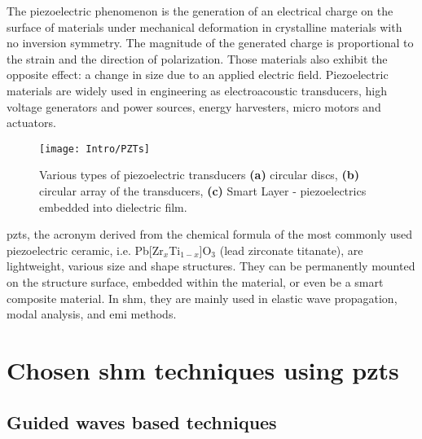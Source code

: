 \documentclass[11pt,a4paper,final]{report}
\begin{document}
The piezoelectric phenomenon is the generation of an electrical charge on the surface of materials under mechanical deformation in crystalline materials with no inversion symmetry.
The magnitude of the generated charge is proportional to the strain and the direction of polarization.
Those materials also exhibit the opposite effect: a change in size due to an applied electric field.
Piezoelectric materials are widely used in engineering as electroacoustic transducers, high voltage generators and power sources, energy harvesters, micro motors and actuators.
\begin{figure}[H]
\texttt{[image: Intro/PZTs]}
\caption{Various types of piezoelectric transducers \textbf{(a)} circular discs, \textbf{(b)} circular array of the transducers, \textbf{(c)} Smart Layer\textsuperscript{\tiny\textregistered} - piezoelectrics embedded into dielectric film.}
	\label{fig:piezo}
\end{figure}
\Acp{pzt}, the acronym derived from the chemical formula of the most commonly used piezoelectric ceramic, i.e. Pb[Zr\(_x\)Ti\(_{1-x}\)]O\(_3\) (lead zirconate titanate), are lightweight, various size and shape structures. 
They can be permanently mounted on the structure surface, embedded within the material, or even be a smart composite material.
In \ac{shm}, they are mainly used in elastic wave propagation, modal analysis, and \ac{emi} methods. \section{Chosen \ac{shm} techniques using \acp{pzt}}
\label{sec:techniques}



\subsection{Guided waves based techniques}
\end{document}
